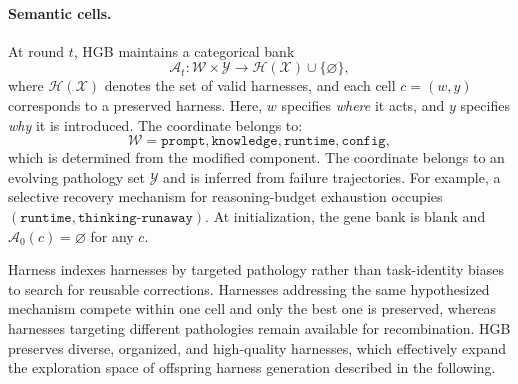 \paragraph{Semantic cells.}
At round $t$, HGB maintains a categorical bank
\begin{equation}
\mathcal{A}_t:
\mathcal{W}\times\mathcal{Y}
\rightarrow
\mathcal{H}(\mathcal{X})\cup\{\varnothing\},
\end{equation}
where $\mathcal{H}(\mathcal{X})$ denotes the set of valid harnesses, and each cell
$c=(w,y)$ corresponds to a preserved harness.
%
Here, $w$ specifies \emph{where} it acts, and $y$ specifies \emph{why} it is introduced.
%
The \where{} coordinate belongs to:
\begin{equation}
\mathcal{W}
=
{
\texttt{prompt},
\texttt{knowledge},
\texttt{runtime},
\texttt{config}
},
\end{equation}
which is determined from the modified component.
%
The \why{} coordinate belongs to an evolving pathology set $\mathcal{Y}$ and is inferred from failure trajectories.
%
%
For example, a selective recovery mechanism for reasoning-budget exhaustion occupies
$(\texttt{runtime},\texttt{thinking-runaway})$.
%
%
At initialization, the gene bank is blank and $\mathcal{A}_0(c)=\varnothing$ for any $c$.
%

Harness indexes harnesses by targeted pathology rather than task-identity biases to search for reusable corrections.
%
Harnesses addressing the same hypothesized mechanism compete within one cell and only the best one is preserved, whereas harnesses targeting different pathologies remain available for recombination.
%
HGB preserves diverse, organized, and high-quality harnesses, which effectively expand the exploration space of offspring harness generation described in the following.


